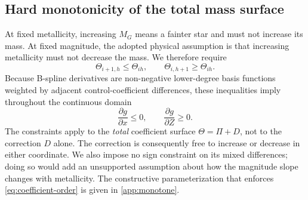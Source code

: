 \subsection{Hard monotonicity of the total mass surface}

At fixed metallicity, increasing $M_G$ means a fainter star and must not
increase its mass.  At fixed magnitude, the adopted physical assumption is
that increasing metallicity must not decrease the mass.  We therefore require
\begin{equation}
 \Theta_{i+1,h}\le\Theta_{ih},\qquad
 \Theta_{i,h+1}\ge\Theta_{ih}.
 \label{eq:coefficient-order}
\end{equation}
Because B-spline derivatives are non-negative lower-degree basis functions
weighted by adjacent control-coefficient differences, these inequalities imply
throughout the continuous domain
\begin{equation}
 \frac{\partial g}{\partial x}\le0,
 \qquad \frac{\partial g}{\partial Z}\ge0.
\end{equation}
The constraints apply to the \emph{total} coefficient surface $\Theta=\Pi+D$,
not to the correction $D$ alone.  The correction is consequently free to
increase or decrease in either coordinate.  We also impose no sign constraint
on its mixed differences; doing so would add an unsupported assumption about
how the magnitude slope changes with metallicity.  The constructive
parameterization that enforces \cref{eq:coefficient-order} is given in
\cref{app:monotone}.


